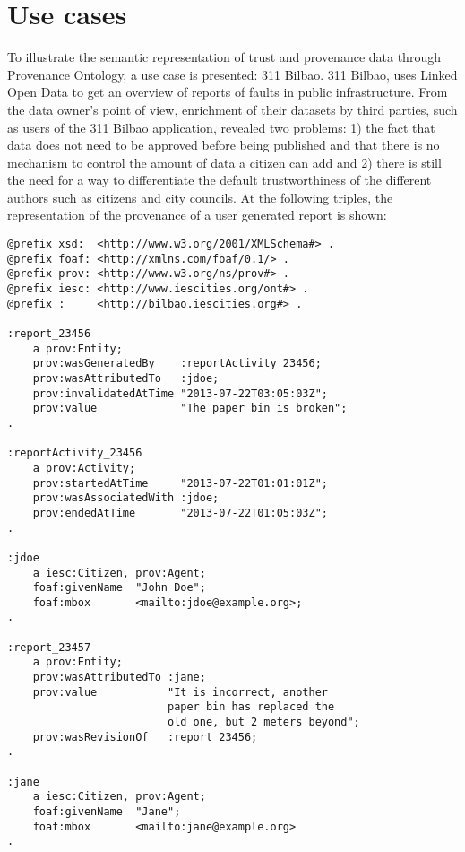 \section{Use cases}
\label{sec:use_cases}

To illustrate the semantic representation of trust and provenance data through Provenance Ontology, a use case is presented: 311 Bilbao. 311 Bilbao, uses Linked Open Data to get an overview of reports of faults in public infrastructure. From the data owner’s point of view, enrichment of their datasets by third parties, such as users of the 311 Bilbao application, revealed two problems: 1) the fact that data does not need to be approved before being published and that there is no mechanism to control the amount of data a citizen can add and 2) there is still the need for a way to differentiate the default trustworthiness of the different authors such as citizens and city councils. At the following triples, the representation of the provenance of a user generated report is shown:

\begin{verbatim}
@prefix xsd:  <http://www.w3.org/2001/XMLSchema#> .
@prefix foaf: <http://xmlns.com/foaf/0.1/> .
@prefix prov: <http://www.w3.org/ns/prov#> .
@prefix iesc: <http://www.iescities.org/ont#> .
@prefix :     <http://bilbao.iescities.org#> .

:report_23456
    a prov:Entity;
    prov:wasGeneratedBy    :reportActivity_23456;
    prov:wasAttributedTo   :jdoe;
    prov:invalidatedAtTime "2013-07-22T03:05:03Z";
    prov:value             "The paper bin is broken";
.

:reportActivity_23456
    a prov:Activity;
    prov:startedAtTime     "2013-07-22T01:01:01Z";
    prov:wasAssociatedWith :jdoe;
    prov:endedAtTime       "2013-07-22T01:05:03Z";
.

:jdoe
    a iesc:Citizen, prov:Agent;
    foaf:givenName  "John Doe";
    foaf:mbox       <mailto:jdoe@example.org>;
.

:report_23457
    a prov:Entity;
    prov:wasAttributedTo :jane;
    prov:value           "It is incorrect, another 
                         paper bin has replaced the 
                         old one, but 2 meters beyond";
    prov:wasRevisionOf   :report_23456;
.

:jane
    a iesc:Citizen, prov:Agent;
    foaf:givenName  "Jane";
    foaf:mbox       <mailto:jane@example.org>
.
\end{verbatim}
